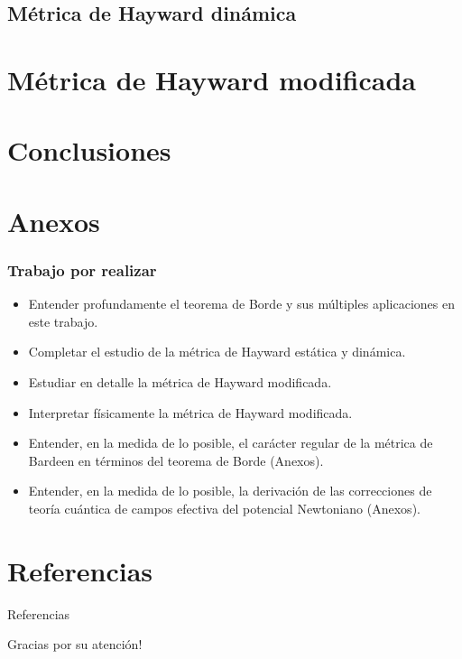 \documentclass[t]{beamer}
\numberwithin{equation}{section}
\begin{document}
\subsection{Métrica de Hayward dinámica}


\section{Métrica de Hayward modificada}


\section{\label{conclusions} Conclusiones}

\section{\label{annex} Anexos}

\begin{frame}
\frametitle{Trabajo por realizar}
\vspace{\fill}
\begin{itemize}
\item Entender profundamente el teorema de Borde y sus múltiples aplicaciones en este trabajo.

\item Completar el estudio de la métrica de Hayward estática y dinámica.


\item Estudiar en detalle la métrica de Hayward modificada.

\item Interpretar físicamente la métrica de Hayward modificada.

\item Entender, en la medida de lo posible, el carácter regular de la métrica de Bardeen en términos del teorema de Borde (Anexos).


\item Entender, en la medida de lo posible, la derivación de las correcciones de teoría cuántica de campos efectiva del potencial Newtoniano (Anexos).
\end{itemize}
\vspace{\fill}
\end{frame}

\section{Referencias}
\begin{frame}{Referencias}
\footnotesize


\end{frame}
 

\begin{frame}
\Huge{
\vspace{\fill}
\centerline{
Gracias por su atención!}
}
\vspace{\fill}
\end{frame}
\end{document}
